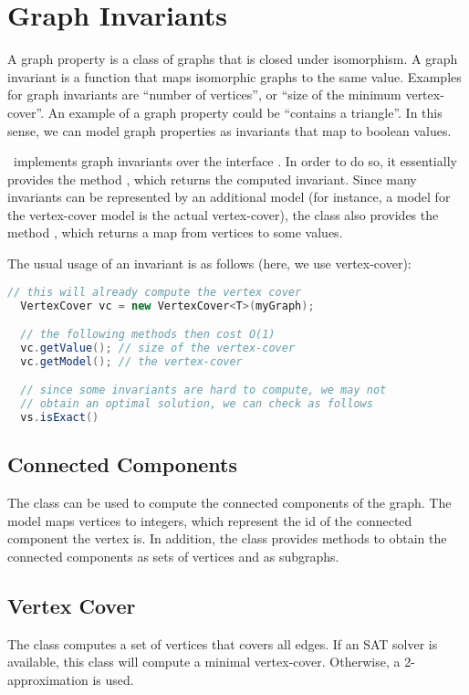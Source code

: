 \documentclass[a4paper, ukenglish, twoside, openright]{jdrasilmanual}
\begin{document}
\chapter{Graph Invariants}
A graph property is a class of graphs that is closed under
isomorphism. A graph invariant is a function that maps isomorphic
graphs to the same value. Examples for graph invariants are ``number of
vertices'', or ``size of the minimum vertex-cover''. An example of a
graph property could be ``contains a triangle''. In this sense, we can
model graph properties as invariants that map to boolean values.

\Jdrasil\ implements graph invariants over the interface . In order to do so, it
essentially provides the method , which returns the
computed invariant.  Since many invariants can be represented by an
additional model (for instance, a model for the vertex-cover model
is the actual vertex-cover), the class also provides the method
, which returns a map from vertices to some values.

The usual usage of an invariant is as follows (here, we use
vertex-cover):
\begin{lstlisting}[language=Java]
  // this will already compute the vertex cover
  VertexCover vc = new VertexCover<T>(myGraph);

  // the following methods then cost O(1)
  vc.getValue(); // size of the vertex-cover
  vc.getModel(); // the vertex-cover

  // since some invariants are hard to compute, we may not 
  // obtain an optimal solution, we can check as follows
  vs.isExact()
\end{lstlisting}

\section{Connected Components}
The class  can be used to compute the
connected components of the graph. The model maps vertices to
integers, which represent the id of the connected component the vertex
is. In addition, the class provides methods to obtain the connected
components as sets of vertices and as subgraphs.

\section{Vertex Cover}
The class  computes a set of vertices that covers all edges. If an SAT solver is
available, this class will compute a minimal vertex-cover. Otherwise,
a 2-approximation is used.
\end{document}
